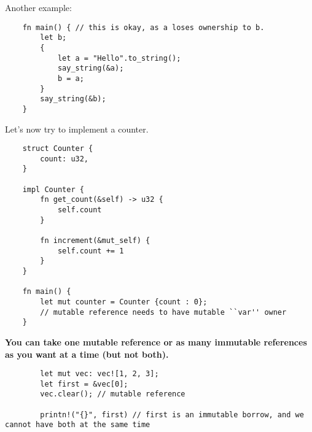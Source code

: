     Another example:
    \begin{lstlisting}
    fn main() { // this is okay, as a loses ownership to b.
        let b;
        {
            let a = "Hello".to_string();
            say_string(&a);
            b = a;
        }
        say_string(&b);
    }
    \end{lstlisting}
    
    Let's now try to implement a counter.
    
    \begin{lstlisting}
    struct Counter {
        count: u32,
    }
    
    impl Counter {
        fn get_count(&self) -> u32 {
            self.count
        }
    
        fn increment(&mut_self) {
            self.count += 1
        }
    }
    
    fn main() {
        let mut counter = Counter {count : 0}; 
        // mutable reference needs to have mutable ``var'' owner
    }
    \end{lstlisting}
    
    \textbf{You can take one mutable reference or as many immutable references as you want at a time (but not both).}
    
    \begin{lstlisting}
        let mut vec: vec![1, 2, 3];
        let first = &vec[0];
        vec.clear(); // mutable reference
    
        printn!("{}", first) // first is an immutable borrow, and we cannot have both at the same time
    \end{lstlisting}
    
    
    
    
    
    
    